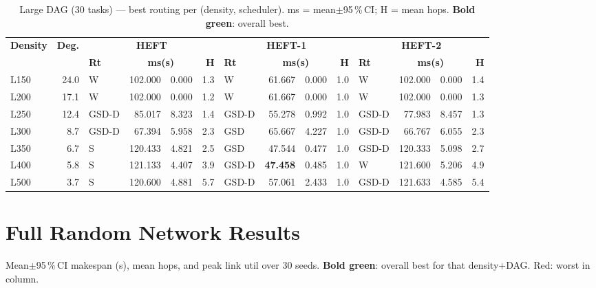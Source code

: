\documentclass[11pt]{article}
\newcommand{\win}[1]{\textcolor{green!50!black}{\textbf{#1}}}
\newcommand{\bad}[1]{\textcolor{red!70!black}{#1}}
\begin{document}
\begin{table}[H]\centering\small
\begin{tabular}{l r l r@{$\pm$}l r l r@{$\pm$}l r l r@{$\pm$}l r}
\toprule
\textbf{Density} & \textbf{Deg.} & \multicolumn{4}{c}{\textbf{HEFT}} & \multicolumn{4}{c}{\textbf{HEFT-1}} & \multicolumn{4}{c}{\textbf{HEFT-2}} \\
\cmidrule(lr){3-6}\cmidrule(lr){7-10}\cmidrule(lr){11-14}
& & \textbf{Rt} & \multicolumn{2}{c}{\textbf{ms(s)}} & \textbf{H} & \textbf{Rt} & \multicolumn{2}{c}{\textbf{ms(s)}} & \textbf{H} & \textbf{Rt} & \multicolumn{2}{c}{\textbf{ms(s)}} & \textbf{H} \\
\midrule
  L150 & 24.0 & W & 102.000 & 0.000 & 1.3 & W & 61.667 & 0.000 & 1.0 & W & 102.000 & 0.000 & 1.4 \\
  L200 & 17.1 & W & 102.000 & 0.000 & 1.2 & W & 61.667 & 0.000 & 1.0 & W & 102.000 & 0.000 & 1.3 \\
  L250 & 12.4 & GSD-D & 85.017 & 8.323 & 1.4 & GSD-D & 55.278 & 0.992 & 1.0 & GSD-D & 77.983 & 8.457 & 1.3 \\
  L300 & 8.7 & GSD-D & 67.394 & 5.958 & 2.3 & GSD & 65.667 & 4.227 & 1.0 & GSD-D & 66.767 & 6.055 & 2.3 \\
  L350 & 6.7 & S & 120.433 & 4.821 & 2.5 & GSD & 47.544 & 0.477 & 1.0 & GSD-D & 120.333 & 5.098 & 2.7 \\
  L400 & 5.8 & S & 121.133 & 4.407 & 3.9 & GSD-D & \win{47.458} & 0.485 & 1.0 & W & 121.600 & 5.206 & 4.9 \\
  L500 & 3.7 & S & 120.600 & 4.881 & 5.7 & GSD-D & 57.061 & 2.433 & 1.0 & GSD-D & 121.633 & 4.585 & 5.4 \\
\bottomrule\end{tabular}
\caption{Large DAG (30 tasks) --- best routing per (density, scheduler). ms = mean$\pm$95\,\%\,CI; H = mean hops. \win{Bold green}: overall best.}
\end{table}

\section{Full Random Network Results}

Mean$\pm$95\,\%\,CI makespan (s), mean hops, and peak link util over 30 seeds. \win{Bold green}: overall best for that density+DAG. \bad{Red}: worst in column.
\end{document}
